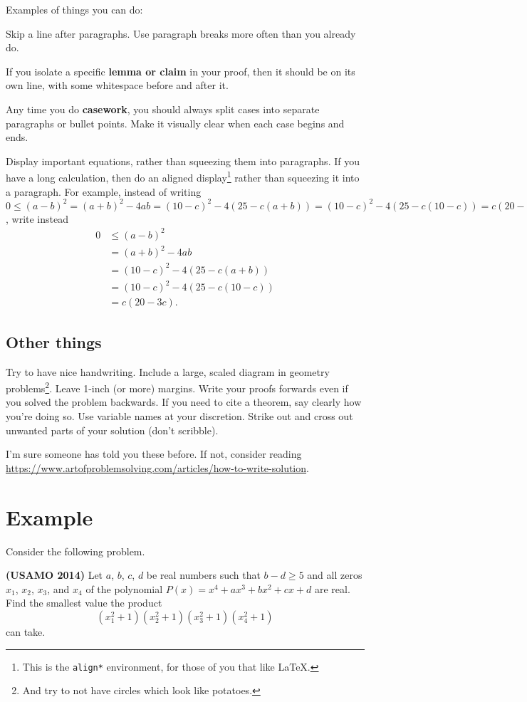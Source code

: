 Examples of things you can do:
\begin{itemize}
	\ii Skip a line after paragraphs.
	Use paragraph breaks more often than you already do.

	\ii If you isolate a specific \textbf{lemma or claim} in your proof,
	then it should be on its own line,
	with some whitespace before and after it.

	\ii Any time you do \textbf{casework},
	you should always split cases into separate paragraphs
	or bullet points.
	Make it visually clear when each case begins and ends.

	\ii Display important equations,
	rather than squeezing them into paragraphs.
	If you have a long calculation,
	then do an aligned display\footnote{This is the
		\texttt{align*} environment,
		for those of you that like \LaTeX.}
	rather than squeezing it into a paragraph.
	For example, instead of writing $0 \le {(a - b)^2} = {(a + b)^2} - 4ab = {(10 - c)^2} - 4\left( {25 - c(a + b)} \right) = {(10 - c)^2} - 4\left( {25 - c(10 - c)} \right) = c(20 - 3c)$, write instead
	\begin{align*}
		0 &\le {(a - b)^2}\\
		 &= {(a + b)^2} - 4ab\\
		 &= {(10 - c)^2} - 4\left( {25 - c(a + b)} \right)\\
		 &= {(10 - c)^2} - 4\left( {25 - c(10 - c)} \right)\\
		 &= c(20 - 3c).
	\end{align*}
\end{itemize}

\subsection{Other things}
Try to have nice handwriting.
Include a large, scaled diagram in geometry problems\footnote{And
try to not have circles which look like potatoes.}.
Leave 1-inch (or more) margins.
Write your proofs forwards even if you solved the problem backwards.
If you need to cite a theorem, say clearly how you're doing so.
Use variable names at your discretion.
Strike out and cross out unwanted parts of your solution (don't scribble).

I'm sure someone has told you these before.
If not, consider reading
\url{https://www.artofproblemsolving.com/articles/how-to-write-solution}.

\section{Example}
Consider the following problem.
\begin{mdframed}
	\textbf{(USAMO 2014)}
	Let $a$, $b$, $c$, $d$ be real numbers such that $b-d \ge 5$
	and all zeros $x_1$, $x_2$, $x_3$, and $x_4$ of the
	polynomial $P(x)=x^4+ax^3+bx^2+cx+d$ are real.
	Find the smallest value the product 
	\[ (x_1^2+1)(x_2^2+1)(x_3^2+1)(x_4^2+1) \]
	can take.
\end{mdframed}

